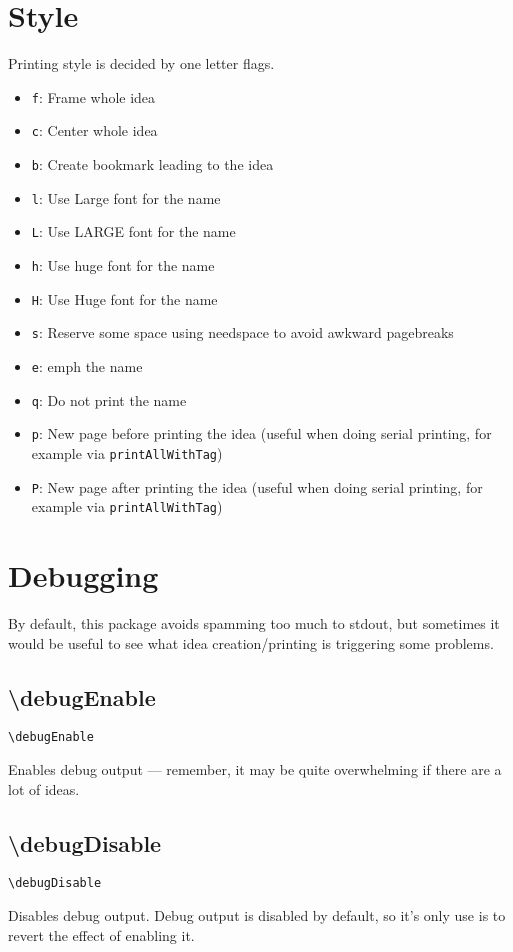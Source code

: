 \documentclass[11pt]{article}
\begin{document}
\section{Style}
\par Printing style is decided by one letter flags.
\begin{itemize}
\item \texttt{f}: Frame whole idea
\item \texttt{c}: Center whole idea
\item \texttt{b}: Create bookmark leading to the idea
\item \texttt{l}: Use Large font for the name
\item \texttt{L}: Use LARGE font for the name
\item \texttt{h}: Use huge font for the name
\item \texttt{H}: Use Huge font for the name
\item \texttt{s}: Reserve some space using needspace to avoid awkward pagebreaks
\item \texttt{e}: emph the name
\item \texttt{q}: Do not print the name
\item \texttt{p}: New page before printing the idea (useful when doing serial printing, for example via \texttt{printAllWithTag})
\item \texttt{P}: New page after printing the idea (useful when doing serial printing, for example via \texttt{printAllWithTag})
\end{itemize}

\section{Debugging}
\par By default, this package avoids spamming too much to stdout, but sometimes it would be useful to see what idea creation/printing is triggering some problems.
\subsection{\textbackslash{}debugEnable}
\begin{verbatim}
\debugEnable
\end{verbatim}
\par Enables debug output --- remember, it may be quite overwhelming if there are a lot of ideas.
\subsection{\textbackslash{}debugDisable}
\begin{verbatim}
\debugDisable
\end{verbatim}
\par Disables debug output. Debug output is disabled by default, so it's only use is to revert the effect of enabling it.
\end{document}
